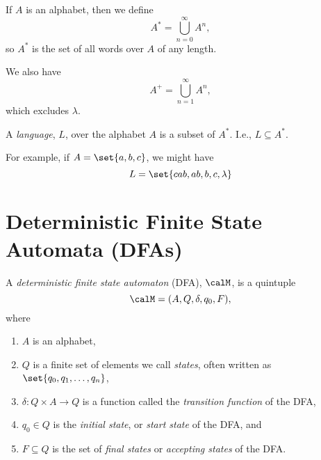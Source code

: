 \documentclass{article}
\theoremstyle{remark}
\begin{document}
\begin{definition}
    If $A$ is an alphabet, then we define
    \[ A^* = \bigcup_{n=0}^\infty A^n, \]
    so $A^*$ is the set of all words over $A$ of any length.

    We also have \[ A^+ = \bigcup_{n=1}^\infty A^n,\] which
    excludes $\lambda$.
\end{definition}

\begin{definition}
    A \emph{language}, $L$, over the alphabet $A$ is a 
    subset of $A^*$. I.e., $L\subseteq A^*$.

    For example, if $A=\set{a,b,c}$, we might have
    \[ L=\set{cab, ab, b, c, \lambda} \]
\end{definition}

\section{Deterministic Finite State Automata (DFAs)}

\begin{definition}
    A \emph{deterministic finite state automaton} (DFA),
    $\calM$, is a quintuple 
    \[ \calM = (A,Q,\delta, q_0, F), \]
    where
    \begin{enumerate}
        \item $A$ is an alphabet,
        \item $Q$ is a finite set of elements we call \emph{states},
            often written as $\set{q_0,q_1,\ldots,q_n}$,
        \item $\delta : Q\times A\to Q$ is a function called the
            \emph{transition function} of the DFA,
        \item $q_0\in Q$ is the \emph{initial state}, or 
            \emph{start state} of the DFA, and 
        \item $F\subseteq Q$ is the set of \emph{final states}
            or \emph{accepting states} of the DFA.
    \end{enumerate}
\end{definition}
\end{document}
